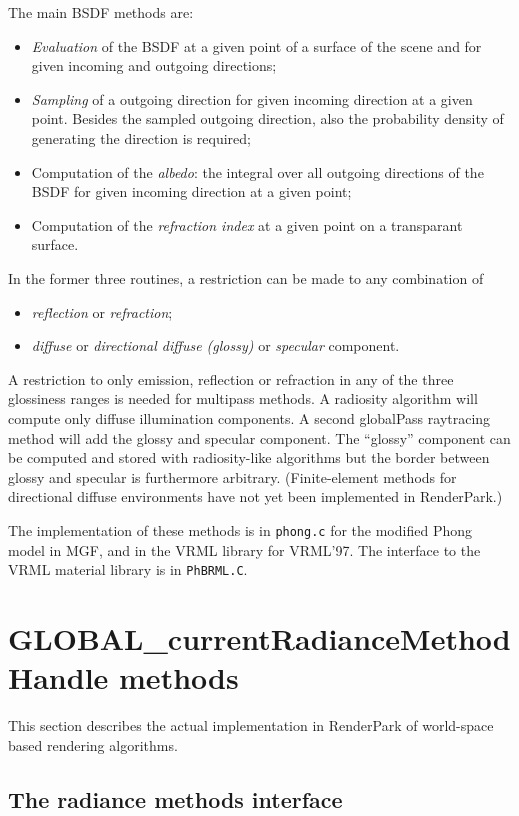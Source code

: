\documentclass[11pt]{report}
\begin{document}
The main BSDF methods are:
\begin{itemize}
\item	{\em Evaluation} of the BSDF at a given point of a surface of the scene and
	for given incoming and outgoing directions;
\item	{\em Sampling} of a outgoing direction for given incoming direction at a given
	point. Besides the sampled outgoing direction, also the probability
	density of generating the direction is required;
\item	Computation of the {\em albedo}: the integral over all outgoing directions of
	the BSDF for given incoming direction at a given point;
\item	Computation of the {\em refraction index} at a given point on a transparant surface.
\end{itemize}
In the former three routines, a restriction can be made to any combination of
\begin{itemize}
\item	{\em reflection} or {\em refraction};
\item	{\em diffuse} or {\em directional diffuse (glossy)} or {\em specular} 
	component.
\end{itemize}
A restriction to only emission, reflection or refraction in any of the 
three glossiness ranges is needed for multipass methods.
A radiosity algorithm will compute only diffuse illumination
components. A second globalPass raytracing method will add the glossy and
specular component. The ``glossy'' component can be computed and stored 
with radiosity-like algorithms but the border between glossy and specular
is furthermore arbitrary. (Finite-element methods for directional diffuse environments
have not yet been implemented in RenderPark.)

The implementation of these methods is in {\tt phong.c} for the modified Phong
model in MGF, and in the VRML library for VRML'97. The interface to the VRML material
library is in {\tt PhBRML.C}.

\chapter{GLOBAL_currentRadianceMethodHandle methods}
\label{radiance-methods}

This section describes the actual implementation in RenderPark of world-space based
rendering algorithms.

\section{The radiance methods interface}
\end{document}
